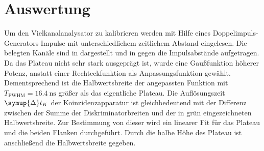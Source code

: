 \section{Auswertung}
\label{sec:Auswertung}

Um den Vielkanalanalysator zu kalibrieren werden mit Hilfe eines Doppelimpuls-Generators Impulse
mit unterschiedlichem zeitlichem Abstand eingelesen. Die belegten Kanäle sind in dargestellt
und in gegen die Impulsabstände aufgetragen.
Da das Plateau nicht sehr stark ausgeprägt ist, wurde eine Gaußfunktion höherer Potenz, anstatt einer Rechteckfunktion als Anpassungsfunktion gewählt.
Dementsprechend ist die Halbwertsbreite der angepassten Funktion mit $T_{\text{FWHM}} = \SI{16,4}{\nano \second}$ größer als das eigentliche Plateau.
Die Auflösungszeit~$\symup{\Delta}t_K$ der Koinzidenzapparatur ist gleichbedeutend
mit der Differenz zwischen der Summe der Diskriminatorbreiten und der in grün
eingezeichneten Halbwertsbreite. Zur Bestimmung von dieser wird
ein linearer Fit für das Plateau und die beiden Flanken durchgeführt. Durch die halbe
Höhe des Plateau ist anschließend die Halbwertsbreite gegeben. 



